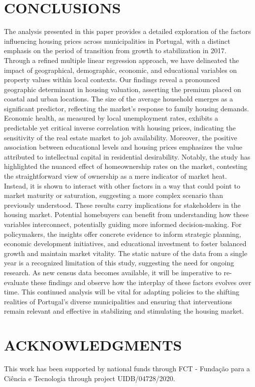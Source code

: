 \documentclass{aip-cp}
\begin{document}
\section{\uppercase{Conclusions}}

The analysis presented in this paper provides a detailed exploration of the factors influencing housing prices across municipalities in Portugal, with a distinct emphasis on the period of transition from growth to stabilization in 2017. Through a refined multiple linear regression approach, we have delineated the impact of geographical, demographic, economic, and educational variables on property values within local contexts.
Our findings reveal a pronounced geographic determinant in housing valuation, asserting the premium placed on coastal and urban locations. The size of the average household emerges as a significant predictor, reflecting the market's response to family housing demands. Economic health, as measured by local unemployment rates, exhibits a predictable yet critical inverse correlation with housing prices, indicating the sensitivity of the real estate market to job availability. Moreover, the positive association between educational levels and housing prices emphasizes the value attributed to intellectual capital in residential desirability.
Notably, the study has highlighted the nuanced effect of homeownership rates on the market, contesting the straightforward view of ownership as a mere indicator of market heat. Instead, it is shown to interact with other factors in a way that could point to market maturity or saturation, suggesting a more complex scenario than previously understood.
These results carry implications for stakeholders in the housing market. Potential homebuyers can benefit from understanding how these variables interconnect, potentially guiding more informed decision-making. For policymakers, the insights offer concrete evidence to inform strategic planning, economic development initiatives, and educational investment to foster balanced growth and maintain market vitality.
The static nature of the data from a single year is a recognized limitation of this study, suggesting the need for ongoing research. As new census data becomes available, it will be imperative to re-evaluate these findings and observe how the interplay of these factors evolves over time. This continued analysis will be vital for adapting policies to the shifting realities of Portugal's diverse municipalities and ensuring that interventions remain relevant and effective in stabilizing and stimulating the housing market.


\section{ACKNOWLEDGMENTS}
This work has been supported by national funds through FCT - Fundação para a Ciência e Tecnologia through project UIDB/04728/2020.



%
%
\end{document}
